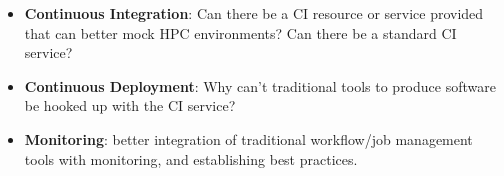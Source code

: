 \begin{itemize}
\item \textbf{Continuous Integration}: Can there be a CI resource or service provided that can better mock HPC environments? Can there be a standard CI service?


\item \textbf{Continuous Deployment}: Why can't traditional tools to produce software be hooked up with the CI service?


\item \textbf{Monitoring}: better integration of traditional workflow/job management tools with monitoring, and establishing best practices.
\end{itemize}
